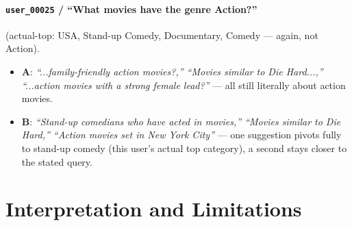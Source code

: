 \documentclass[11pt,a4paper]{article}
\newcommand{\code}[1]{\texttt{#1}}
\begin{document}
\paragraph{\code{user\_00025} / ``What movies have the genre Action?''} (actual-top: USA, Stand-up
Comedy, Documentary, Comedy --- again, not Action).

\begin{itemize}
    \item \textbf{A}: \emph{``...family-friendly action movies?,'' ``Movies similar to Die
        Hard...,'' ``...action movies with a strong female lead?''} --- all still literally about
        action movies.
    \item \textbf{B}: \emph{``Stand-up comedians who have acted in movies,'' ``Movies similar to
        Die Hard,'' ``Action movies set in New York City''} --- one suggestion pivots fully to
        stand-up comedy (this user's actual top category), a second stays closer to the stated
        query.
\end{itemize}

\section{Interpretation and Limitations}
\label{sec:limits}
\end{document}
